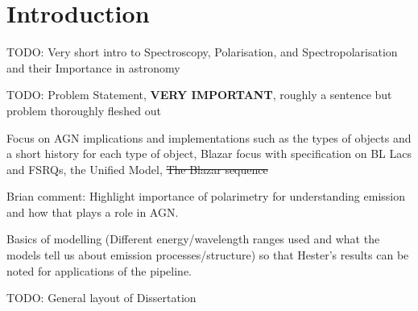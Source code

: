 \chapter{Introduction}
TODO: Very short intro to Spectroscopy, Polarisation, and Spectropolarisation and their Importance in astronomy
\prgph

\noindent TODO: Problem Statement, \textbf{VERY IMPORTANT}, roughly a sentence but problem thoroughly fleshed out
\prgph

\noindent Focus on AGN implications and implementations such as the types of objects and a short history for each type of object, Blazar focus with specification on BL Lacs and FSRQs, the Unified Model, \sout{The Blazar sequence}

Brian comment: Highlight importance of polarimetry for understanding emission and how that plays a role in AGN.

Basics of modelling (Different energy/wavelength ranges used and what the models tell us about emission processes/structure) so that Hester's results can be noted for applications of the pipeline.
\prgph

\noindent TODO: General layout of Dissertation
